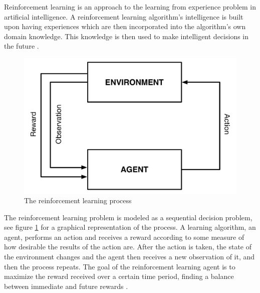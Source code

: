 Reinforcement learning is an approach to the learning from experience problem in artificial intelligence. A reinforcement learning algorithm's intelligence is built upon having experiences which are then incorporated into the algorithm's own domain knowledge. This knowledge is then used to make intelligent decisions in the future \parencite{barto1998reinforcement}.

\begin{figure}[H]
\includegraphics[width=\textwidth]{images/agent-environment.pdf}
\caption{The reinforcement learning process}
\label{fig:agentandenvironment}
\end{figure}

The reinforcement learning problem is modeled as a sequential decision problem, see figure \ref{fig:agentandenvironment} for a graphical representation of the process. A learning algorithm, an agent, performs an action and receives a reward according to some measure of how desirable the results of the action are.  After the action is taken, the state of the environment changes and the agent then receives a new observation of it, and then the process repeats. The goal of the reinforcement learning agent is to maximize the reward received over a certain time period, finding a balance between immediate and future rewards \parencite{barto1998reinforcement}. 




